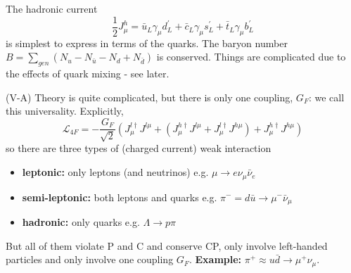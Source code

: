 \documentclass[a4paper,12pt]{article}
\begin{document}
The hadronic current
\begin{equation}
\frac{1}{2}J_\mu^h = \bar{u}_L\gamma_\mu d_L^\prime + \bar{c}_L \gamma_\mu s_L^\prime + \bar{t}_L \gamma_\mu b_L^\prime
\end{equation}
is simplest to express in terms of the quarks. The baryon number $B = \sum_{gen} (N_u -N_{\bar{u}} - N_d + N_{\bar{d}})$ is conserved. Things are complicated due to the effects of quark mixing - see later.

(V-A) Theory is quite complicated, but there is only one coupling, $G_F$: we call this universality. Explicitly,
\begin{equation}
\mathcal{L}_{4F} = -\frac{G_F}{\sqrt{2}} (J_\mu^{l \dagger} J^{l\mu} + (J_\mu^{h \dagger} J^{l\mu} + J_\mu^{l \dagger} J^{h\mu}) + J_\mu^{h \dagger} J^{h\mu} ) 
\end{equation}
so there are three types of (charged current) weak interaction
\begin{itemize}
    \item \textbf{leptonic:} only leptons (and neutrinos) e.g. $\mu \to e \nu_\mu \bar{\nu}_e$
    \item \textbf{semi-leptonic:} both leptons and quarks e.g. $\pi^- = d\bar{u} \to \mu^- \bar{\nu}_\mu$
    \item \textbf{hadronic:} only quarks e.g. $\Lambda \to p \pi$
\end{itemize}
But all of them violate P and C and conserve CP, only involve left-handed particles and only involve one coupling $G_F$. 
\newline
\newline
\textbf{Example:} $\pi^+ \approx u\bar{d} \to \mu^+ \nu_\mu$. 
\newline
\begin{figure}[h!]
\centering 
{}
\end{figure}
\end{document}
